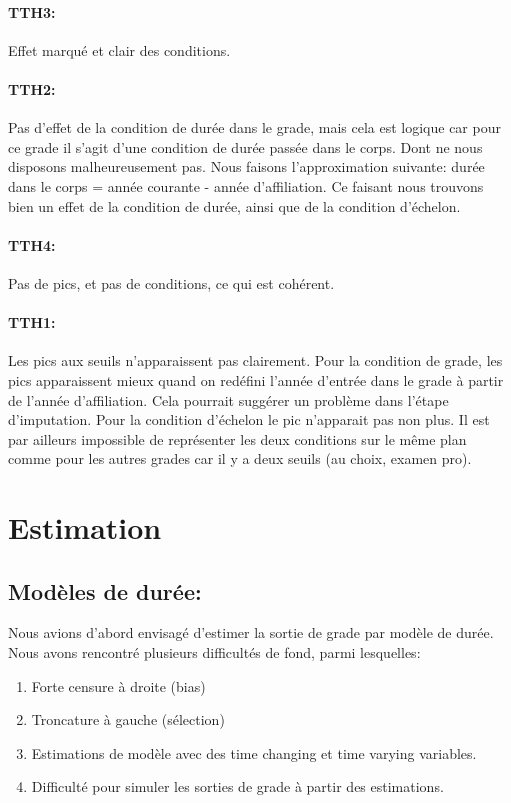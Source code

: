 \documentclass[11pt,a4paper]{article}
\begin{document}
\paragraph{TTH3:} Effet marqué et clair des conditions.

\paragraph{TTH2:} Pas d'effet de la condition de durée dans le grade, mais cela est logique car pour ce grade il s'agit d'une condition de durée passée dans le corps. Dont ne nous disposons malheureusement pas. Nous faisons l'approximation suivante: durée dans le corps = année courante - année d'affiliation. Ce faisant nous trouvons bien un effet de la condition de durée, ainsi que de la condition d'échelon. 

\paragraph{TTH4:} Pas de pics, et pas de conditions, ce qui est cohérent. 
 
\paragraph{TTH1:} Les pics aux seuils n'apparaissent pas clairement. Pour la condition de grade, les pics apparaissent mieux quand on redéfini l'année d'entrée dans le grade à partir de l'année d'affiliation. Cela pourrait suggérer un problème dans l'étape d'imputation. 
Pour la condition d'échelon le pic n'apparait pas non plus. Il est par ailleurs impossible de représenter les deux conditions sur le même plan comme pour les autres grades car il y a deux seuils (au choix, examen pro). 



\section{Estimation}

\subsection*{Modèles de durée:} 

Nous avions d'abord envisagé d'estimer la sortie de grade par modèle de durée. Nous avons rencontré plusieurs difficultés de fond, parmi lesquelles: 

\begin{enumerate}
\item Forte censure à droite (bias)
\item Troncature à gauche (sélection)
\item Estimations de modèle avec des \og time changing \fg{} et \og time varying \fg{} variables. 
\item Difficulté pour simuler les sorties de grade à partir des estimations. 
\end{enumerate}
\end{document}
